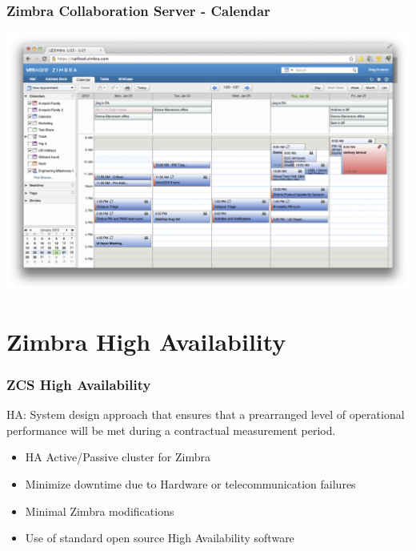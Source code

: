 \documentclass[10pt]{beamer}
\begin{document}
\begin{frame}
\frametitle{Zimbra Collaboration Server - Calendar}

\begin{center}
  \includegraphics[scale=0.4,keepaspectratio=true]{./img/zimbra-calendar.jpg}
\end{center}


\end{frame}
\section {Zimbra High Availability}
\begin{frame}
\frametitle{ZCS High Availability}


\begin{block}{}
HA: System design approach that ensures that a prearranged level of operational performance will be met during a contractual measurement period.
\end{block}


\quad

\begin{itemize}

\item HA Active/Passive cluster for Zimbra
\item Minimize downtime due to Hardware or telecommunication failures
\item Minimal Zimbra modifications
\item Use of standard open source High Availability software

\end{itemize}

\end{frame}
\end{document}
